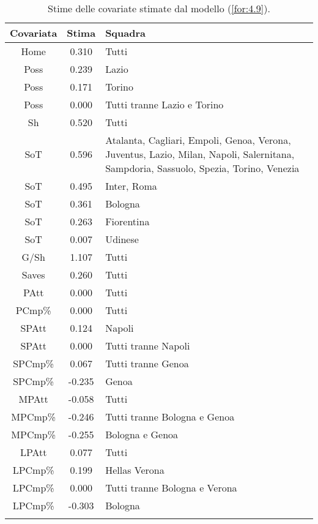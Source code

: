\begin{table}[!htbp]
	
	\renewcommand{\arraystretch}{1.7}
	\centering
	\begin{tabular}{ccp{10cm}}
		\hline	
		
		\textbf{Covariata} & \textbf{Stima} & \textbf{Squadra} \\	
		\hline
		Home & 0.310 & Tutti\\
		Poss & 0.239 & Lazio \\
		Poss & 0.171 & Torino\\
		Poss & 0.000 & Tutti tranne Lazio e Torino\\
		Sh & 0.520 & Tutti \\
		SoT & 0.596 & Atalanta, Cagliari, Empoli, Genoa, Verona, Juventus, Lazio, Milan, Napoli, Salernitana, Sampdoria, Sassuolo, Spezia, Torino, Venezia\\
		SoT & 0.495 & Inter, Roma \\
		SoT & 0.361 & Bologna \\
		SoT & 0.263 & Fiorentina\\
		SoT & 0.007 & Udinese \\
		G/Sh & 1.107 & Tutti \\
		Saves & 0.260 & Tutti \\
		PAtt & 0.000 & Tutti \\
		PCmp\% & 0.000 & Tutti \\
		SPAtt & 0.124 & Napoli \\
		SPAtt & 0.000 & Tutti tranne Napoli \\
		SPCmp\% & 0.067 & Tutti tranne Genoa \\ 
		SPCmp\% & -0.235 & Genoa \\	
		MPAtt & -0.058 & Tutti \\ 
		MPCmp\% & -0.246 & Tutti tranne Bologna e Genoa \\
		MPCmp\% & -0.255 & Bologna e Genoa \\
		LPAtt & 0.077 & Tutti \\
		LPCmp\% & 0.199 & Hellas Verona \\
		LPCmp\% & 0.000 & Tutti tranne Bologna e Verona \\
		LPCmp\% & -0.303 & Bologna \\	     		   		    
		\hline
		& &  \\
		
	\end{tabular} \hbox{}
	\caption{Stime delle covariate stimate dal modello (\ref{for:4.9}).} \label{tab:BTCL2} 
	
\end{table}
